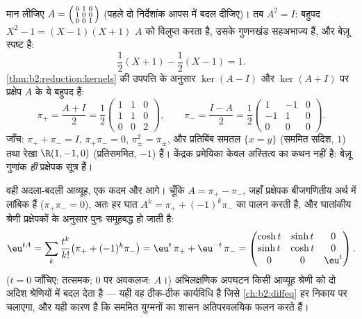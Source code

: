\begin{example}[स्पष्ट प्रक्षेपकों के साथ केंद्रक प्रमेयिका]\label{ex:b2:reduction:projectorswork}
मान लीजिए $A = \begin{psmallmatrix}0 & 1 & 0\\ 1 & 0 & 0\\ 0 & 0 &
1\end{psmallmatrix}$ (पहले दो निर्देशांक आपस में बदल दीजिए)। तब $A^2
= I$: बहुपद
$X^2 - 1 = (X - 1)(X + 1)$ $A$ को विलुप्त करता है, उसके गुणनखंड सहअभाज्य हैं, और बेज़ू स्पष्ट
है:
\[
\frac{1}{2}(X + 1) - \frac12(X - 1) = 1 .
\]
\cref{thm:b2:reduction:kernels} की उपपत्ति के अनुसार $\ker(A - I)$ और $\ker(A + I)$ पर प्रक्षेप $A$ के ये बहुपद हैं:
\[
\pi_+ = \frac{A + I}{2} = \frac12\begin{pmatrix}
1 & 1 & 0\\ 1 & 1 & 0\\ 0 & 0 & 2\end{pmatrix},
\qquad
\pi_- = \frac{I - A}{2} = \frac12\begin{pmatrix}
1 & -1 & 0\\ -1 & 1 & 0\\ 0 & 0 & 0\end{pmatrix}.
\]
जाँच: $\pi_+ + \pi_- = I$, $\pi_+\pi_- = 0$, $\pi_\pm^2 =
\pi_\pm$, और प्रतिबिंब समतल $\{x = y\}$ (सममित सदिश,
 $1$) तथा रेखा $\R(1, -1, 0)$ (प्रतिसममित,  $-1$)
हैं। केंद्रक प्रमेयिका केवल अस्तित्व का कथन नहीं है: बेज़ू गुणांक
\emph{ही} प्रक्षेपक सूत्र हैं।
\end{example}

\begin{example}[प्रक्षेपक घातांकीय भी परिकलित कर देते हैं]\label{ex:b2:reduction:expprojectors}
वही अदला-बदली आव्यूह, एक कदम और आगे। चूँकि $A = \pi_+ -
\pi_-$, जहाँ प्रक्षेपक
बीजगणितीय अर्थ में लांबिक हैं ($\pi_+\pi_- = 0$), अतः हर घात $A^k = \pi_+ +
(-1)^k\pi_-$ का पालन करती है,
और घातांकीय श्रेणी प्रक्षेपकों के अनुसार पुनः समूहबद्ध हो जाती है:
\[
\eu^{tA} = \sum_k \frac{t^k}{k!}\bigl(\pi_+ +
(-1)^k\pi_-\bigr)
= \eu^{t}\,\pi_+ + \eu^{-t}\,\pi_- =
\begin{pmatrix}
\cosh t & \sinh t & 0\\
\sinh t & \cosh t & 0\\
0 & 0 & \eu^{t}
\end{pmatrix}.
\]
($t = 0$ जाँचिए: तत्समक; $0$ पर अवकलज: $A$।) अभिलक्षणिक अपघटन किसी आव्यूह
श्रेणी को दो अदिश श्रेणियों में बदल देता है --- यही वह ठीक-ठीक
कार्यविधि है जिसे \cref{ch:b2:diffeq} हर  निकाय पर चलाएगा, और यही कारण है कि
सममित युग्मनों का शासन अतिपरवलयिक फलन करते हैं।
\end{example}

